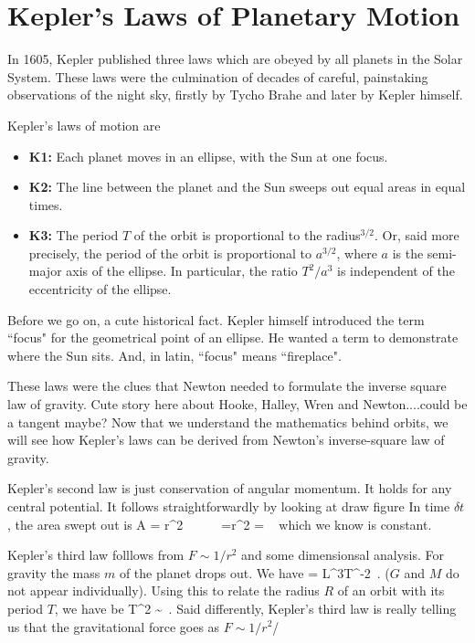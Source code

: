 \newpage
\section{Kepler's Laws of Planetary Motion}


In 1605, Kepler published three laws which are obeyed by all planets in the Solar System. These laws were the culmination of decades of careful, painstaking observations of the night sky, firstly by Tycho Brahe and later by Kepler himself. {\co Kepler's laws of motion are
\begin{itemize}
\item {\bf K1:} Each planet moves in an ellipse, with the Sun at one focus. \vskip 3mm
\item {\bf K2:} The line between the planet and the Sun sweeps out equal areas in equal times. \vskip 3mm
\item {\bf K3:} The period $T$ of the orbit is proportional to the radius${}^{3/2}$. Or, said more precisely, the period of the orbit is proportional to $a^{3/2}$, where $a$ is the semi-major axis of the ellipse. In particular, the ratio $T^2/a^3$ is independent of the eccentricity of the ellipse. 
\end{itemize}
%
}
Before we go on, a cute historical fact. Kepler himself introduced the term ``focus" for the geometrical point of an ellipse. He wanted a term to demonstrate where the Sun sits. And, in latin, ``focus" means ``fireplace". 

\para
These laws were the clues that Newton needed to formulate the inverse square law of gravity. {\cblue Cute story here about Hooke, Halley, Wren and Newton....could be a tangent maybe?} Now that we understand the mathematics behind orbits, we will see how Kepler's  laws can be derived from Newton's inverse-square law of gravity. 



\para
{\co  Kepler's second law is just conservation of angular momentum. It holds for any central potential. It follows straightforwardly by looking at {\cblue draw figure} In time $\delta t$, the area swept out is 
%
\be \delta A = r^2\delta \theta \ \ \ \Longrightarrow \ \ \ =r^2\dot{\theta} = \ \ee
%
which we know is constant. }


\para
{\co Kepler's third law folllows from $F\sim 1/r^2$ and some  dimensionsal analysis. For gravity the mass $m$ of the planet drops out. We have
%
\be [GM] = L^3T^{-2}\ .\ee
%
}  ($G$ and $M$ do not appear individually). {\co Using this to relate the radius $R$ of an orbit with its period $T$, we have
%
\be be T^2 \sim {}\ .\ee
%
} Said differently, Kepler's third law is really telling us that the gravitational force goes as $F\sim 1/r^2$/

